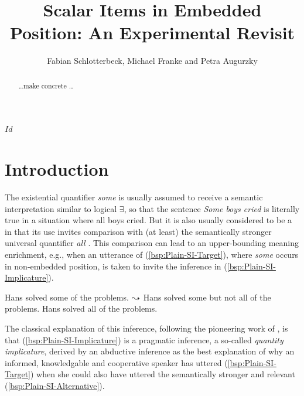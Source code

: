 \documentclass[fleqn,reqno,10pt,draft]{article}
\title{Scalar Items in Embedded Position: {A}n Experimental Revisit}
\author{Fabian Schlotterbeck, Michael Franke and Petra Augurzky}
\date{}
\begin{document}
\maketitle



\begin{abstract}
  \dots make concrete \dots
\end{abstract}

\tableofcontents

\svnInfo $Id$

\section{Introduction}
\label{sec:introduction}

The existential quantifier \emph{some} is usually assumed to receive a
semantic interpretation similar to logical $\exists$, so that the
sentence \emph{Some boys cried} is literally true in a situation where
all boys cried. But it is also usually considered to be a
 in that its use invites comparison with (at
least) the semantically stronger universal quantifier \emph{all}
\citep[c.f.][]{Horn1972:On-the-Semantic,Gazdar1979:Pragmatics:-Imp,AtlasLevinson1981}. This
comparison can lead to an upper-bounding meaning enrichment, e.g.,
when an utterance of (\ref{bsp:Plain-SI-Target}), where \emph{some}
occurs in non-embedded position, is taken to invite the inference in
(\ref{bsp:Plain-SI-Implicature}).

\begin{exe}
  \ex \label{bsp:Plain-SI}
    \begin{xlist}
      \ex \label{bsp:Plain-SI-Target} Hans solved some of the
        problems.
      \ex \label{bsp:Plain-SI-Implicature} $\leadsto$ Hans solved
        some but not all of the problems.
      \ex \label{bsp:Plain-SI-Alternative} Hans solved all of the problems.
    \end{xlist}
\end{exe}

\noindent The classical explanation of this inference, following the
pioneering work of \citet{Grice1975:Logic-and-Conve} \citep[see][for
recent overview]{Geurts2010:Quantity-Implic}, is that
(\ref{bsp:Plain-SI-Implicature}) is a pragmatic inference, a so-called
\emph{quantity implicature}, derived by an abductive inference as the
best explanation of why an informed, knowledgable and cooperative
speaker has uttered (\ref{bsp:Plain-SI-Target}) when she could also have uttered the
semantically stronger and relevant (\ref{bsp:Plain-SI-Alternative}).
\end{document}
